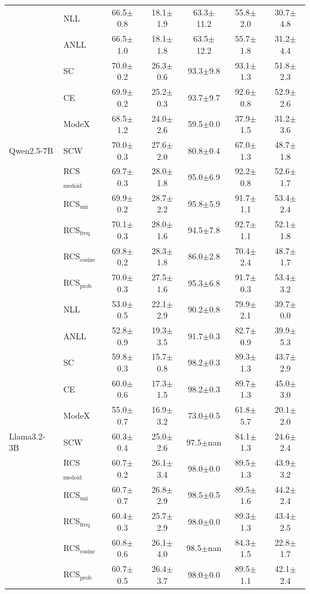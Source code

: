 \begin{table}[t]
{\begin{tabular}{ll|ccccc}
    \multirow{11}{*}{Qwen2.5-7B}
    & NLL & 66.5$\pm$0.8	&18.1$\pm$1.9	&63.3$\pm$11.2	&55.8$\pm$2.0	&30.7$\pm$4.8\\
    & ANLL & 66.5$\pm$1.0&	18.1$\pm$1.8	&63.5$\pm$12.2	&55.7$\pm$1.8	&31.2$\pm$4.4\\
    & SC  & 70.0$\pm$0.2	&26.3$\pm$0.6	&93.3$\pm$9.8	&93.1$\pm$1.3&	51.8$\pm$2.3\\
    & CE    & 69.9$\pm$0.2	&25.2$\pm$0.3	&93.7$\pm$9.7	&92.6$\pm$0.8&	52.9$\pm$2.6\\
    & ModeX & 68.5$\pm$1.2 & 24.0$\pm$2.6 & 59.5$\pm$0.0 & 37.9$\pm$1.5 & 31.2$\pm$3.6\\
    & SCW & 70.0$\pm$0.3 & 27.6$\pm$2.0 & 80.8$\pm$0.4 & 67.0$\pm$1.3 & 48.7$\pm$1.8\\
    & RCS$_\text{medoid}$  &69.7$\pm$0.3&	28.0$\pm$1.8	&95.0$\pm$6.9&	92.2$\pm$0.8	&52.6$\pm$1.7\\
    & RCS$_\text{uni}$&69.9$\pm$0.2	&28.7$\pm$2.2	&95.8$\pm$5.9	&91.7$\pm$1.1	&53.4$\pm$2.4\\
    &  RCS$_\text{freq}$&70.1$\pm$0.3	&28.0$\pm$1.6	&94.5$\pm$7.8	&92.7$\pm$1.1&	52.1$\pm$1.8\\
    & RCS$_\text{cosine}$ & 69.8$\pm$0.2 & 28.3$\pm$1.8 & 86.0$\pm$2.8 & 70.4$\pm$2.4 & 48.7$\pm$1.7\\
    &  RCS$_\text{prob}$  &70.0$\pm$0.3&	27.5$\pm$1.6&	95.3$\pm$6.8	&91.7$\pm$0.3	&53.4$\pm$3.2\\
    \midrule

    \multirow{11}{*}{Llama3.2-3B}
    & NLL & 53.0$\pm$0.5	&22.1$\pm$2.9	&90.2$\pm$0.8	&79.9$\pm$2.1	&39.7$\pm$0.0\\
    & ANLL & 52.8$\pm$0.9	&19.3$\pm$3.5	&91.7$\pm$0.3	&82.7$\pm$0.9	&39.9$\pm$5.3\\
    & SC  & 59.8$\pm$0.3	&15.7$\pm$0.8	&98.2$\pm$0.3	&89.3$\pm$1.3	&43.7$\pm$2.9\\
    & CE    & 60.0$\pm$0.6	&17.3$\pm$1.5	&98.2$\pm$0.3	&89.7$\pm$1.3	&45.0$\pm$3.0\\
    & ModeX    & 55.0$\pm$0.7	&16.9$\pm$3.2	&73.0$\pm$0.5	&61.8$\pm$5.7	&20.1$\pm$2.0\\
    & SCW & 60.3$\pm$0.4 & 25.0$\pm$2.6 & 97.5$\pm$nan & 84.1$\pm$1.3 & 24.6$\pm$2.4\\

    & RCS$_\text{medoid}$  &60.7$\pm$0.2&	26.1$\pm$3.4&	98.0$\pm$0.0&	89.5$\pm$1.3	&43.9$\pm$3.2\\
    & RCS$_\text{uni}$& 60.7$\pm$0.7	&26.8$\pm$2.9&	98.5$\pm$0.5	&89.5$\pm$1.6	&44.2$\pm$2.4\\
    &  RCS$_\text{freq}$&60.4$\pm$0.3	&25.7$\pm$2.9&	98.0$\pm$0.0	&89.3$\pm$1.3	&43.4$\pm$2.5\\
    & RCS$_\text{cosine}$ & 60.8$\pm$0.6 & 26.1$\pm$4.0 & 98.5$\pm$nan & 84.3$\pm$1.5 & 22.8$\pm$1.7\\
    &  RCS$_\text{prob}$  &60.7$\pm$0.5&	26.4$\pm$3.7	&98.0$\pm$0.0&	89.5$\pm$1.1&	42.1$\pm$2.4\\
    \midrule


\end{tabular}}
\end{table}
